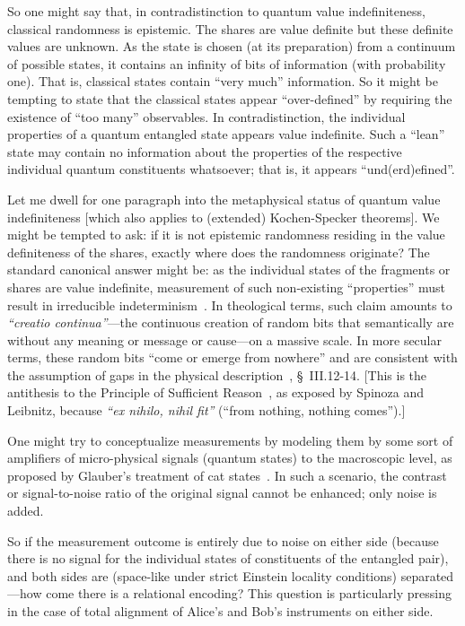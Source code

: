 \documentclass[entropy,article,accept,oneauthor,pdftex]{Definitions/mdpi}
\begin{document}
So one might say that, in contradistinction to quantum value indefiniteness,
classical randomness is epistemic. The shares are value definite but these definite values are unknown.
As the state is chosen (at its preparation) from a continuum of possible states, it contains an infinity of bits of information (with probability one).
That is, classical states contain ``very much'' information.
So it might be tempting to state that the classical states appear ``over-defined'' by requiring the existence of ``too many'' observables.
In contradistinction, the individual properties of a quantum entangled state appears value indefinite.
Such a ``lean'' state may contain no information about the properties of the respective individual quantum constituents whatsoever; that is,
it appears ``und(erd)efined''.


Let me dwell for one paragraph into the metaphysical status of quantum value indefiniteness
[which also applies to (extended) Kochen-Specker theorems].
We might be tempted to ask: if it is not epistemic randomness residing in the value definiteness of the shares, exactly where does the randomness originate?
The standard canonical answer might be: as the individual states of the fragments or shares are value indefinite,
measurement of such non-existing ``properties'' must result in irreducible indeterminism~\cite{zeil-05_nature_ofQuantum}.
In theological terms, such claim amounts to {\it ``{creatio continua}''}---the continuous creation of random bits that semantically are without any meaning or message or cause---on a massive scale.
In more secular terms, these random bits ``come or emerge from nowhere'' and are consistent with
the assumption of gaps in the physical description~\cite{frank,franke}, \S~III.12-14.
[This is the antithesis to the Principle of Sufficient Reason~\cite{sep-sufficient-reason},
as exposed by Spinoza and Leibnitz, because {\it ``{ex nihilo, nihil fit}''} (``from nothing, nothing comes'').]

One might try to conceptualize measurements by modeling them by some sort of amplifiers of micro-physical signals (quantum states) to the macroscopic level,
as proposed by Glauber's treatment of cat states~\cite{Glauber-cat-86}.
In such a scenario,
the contrast or signal-to-noise ratio of the original signal cannot be enhanced; only noise is added.

So if the measurement outcome is entirely due to noise on either side (because there is no signal for the individual states of constituents of the entangled pair),
and both sides are (space-like under strict Einstein locality conditions) separated---how come there is a relational encoding?
This question is particularly pressing in the case of total alignment of Alice's and Bob's instruments on either side.
\end{document}
